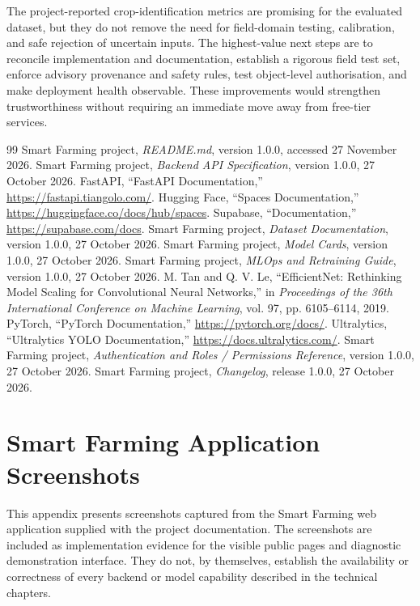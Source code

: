 \documentclass[12pt,a4paper,oneside,openany]{report}
\begin{document}
The project-reported crop-identification metrics are promising for the evaluated dataset, but they do not remove the need for field-domain testing, calibration, and safe rejection of uncertain inputs. The highest-value next steps are to reconcile implementation and documentation, establish a rigorous field test set, enforce advisory provenance and safety rules, test object-level authorisation, and make deployment health observable. These improvements would strengthen trustworthiness without requiring an immediate move away from free-tier services.

\begin{thebibliography}{99}
 Smart Farming project, \textit{README.md}, version 1.0.0, accessed 27 November 2026.
 Smart Farming project, \textit{Backend API Specification}, version 1.0.0, 27 October 2026.
 FastAPI, ``FastAPI Documentation,'' \url{https://fastapi.tiangolo.com/}.
 Hugging Face, ``Spaces Documentation,'' \url{https://huggingface.co/docs/hub/spaces}.
 Supabase, ``Documentation,'' \url{https://supabase.com/docs}.
 Smart Farming project, \textit{Dataset Documentation}, version 1.0.0, 27 October 2026.
 Smart Farming project, \textit{Model Cards}, version 1.0.0, 27 October 2026.
 Smart Farming project, \textit{MLOps and Retraining Guide}, version 1.0.0, 27 October 2026.
 M. Tan and Q. V. Le, ``EfficientNet: Rethinking Model Scaling for Convolutional Neural Networks,'' in \textit{Proceedings of the 36th International Conference on Machine Learning}, vol. 97, pp. 6105--6114, 2019.
 PyTorch, ``PyTorch Documentation,'' \url{https://pytorch.org/docs/}.
 Ultralytics, ``Ultralytics YOLO Documentation,'' \url{https://docs.ultralytics.com/}.
 Smart Farming project, \textit{Authentication and Roles / Permissions Reference}, version 1.0.0, 27 October 2026.
 Smart Farming project, \textit{Changelog}, release 1.0.0, 27 October 2026.
\end{thebibliography}

\appendix

\chapter{Smart Farming Application Screenshots}
This appendix presents screenshots captured from the Smart Farming web application supplied with the project documentation. The screenshots are included as implementation evidence for the visible public pages and diagnostic demonstration interface. They do not, by themselves, establish the availability or correctness of every backend or model capability described in the technical chapters.
\end{document}
